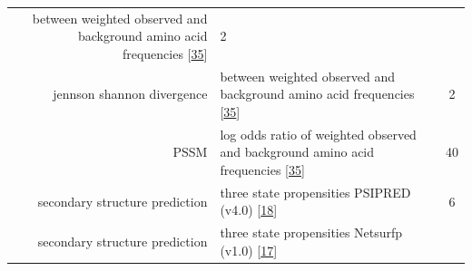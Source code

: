 \documentclass[12pt,a4paper,twoside]{book}
\theoremstyle{definition}
\theoremstyle{definition}
\theoremstyle{remark}
\begin{document}
\begin{longtable}[]{@{}rlc@{}}
\begin{minipage}[t]{0.50\columnwidth}
between weighted observed and background amino acid frequencies
{[}\protect\hyperlink{ref-Robinson1991}{35}{]}\strut
\end{minipage} & \begin{minipage}[t]{0.18\columnwidth}\centering\strut
2\strut
\end{minipage}\tabularnewline
\begin{minipage}[t]{0.23\columnwidth}\raggedleft\strut
jennson shannon divergence\strut
\end{minipage} & \begin{minipage}[t]{0.50\columnwidth}\raggedright\strut
between weighted observed and background amino acid frequencies
{[}\protect\hyperlink{ref-Robinson1991}{35}{]}\strut
\end{minipage} & \begin{minipage}[t]{0.18\columnwidth}\centering\strut
2\strut
\end{minipage}\tabularnewline
\begin{minipage}[t]{0.23\columnwidth}\raggedleft\strut
PSSM\strut
\end{minipage} & \begin{minipage}[t]{0.50\columnwidth}\raggedright\strut
log odds ratio of weighted observed and background amino acid
frequencies {[}\protect\hyperlink{ref-Robinson1991}{35}{]}\strut
\end{minipage} & \begin{minipage}[t]{0.18\columnwidth}\centering\strut
40\strut
\end{minipage}\tabularnewline
\begin{minipage}[t]{0.23\columnwidth}\raggedleft\strut
secondary structure prediction\strut
\end{minipage} & \begin{minipage}[t]{0.50\columnwidth}\raggedright\strut
three state propensities PSIPRED (v4.0)
{[}\protect\hyperlink{ref-Jones1999}{18}{]}\strut
\end{minipage} & \begin{minipage}[t]{0.18\columnwidth}\centering\strut
6\strut
\end{minipage}\tabularnewline
\begin{minipage}[t]{0.23\columnwidth}\raggedleft\strut
secondary structure prediction\strut
\end{minipage} & \begin{minipage}[t]{0.50\columnwidth}\raggedright\strut
three state propensities Netsurfp (v1.0)
{[}\protect\hyperlink{ref-Petersen2009a}{17}{]}\strut
\end{minipage} & \begin{minipage}[t]{0.18\columnwidth}\centering\strut

\end{minipage}
\end{longtable}
\end{document}
